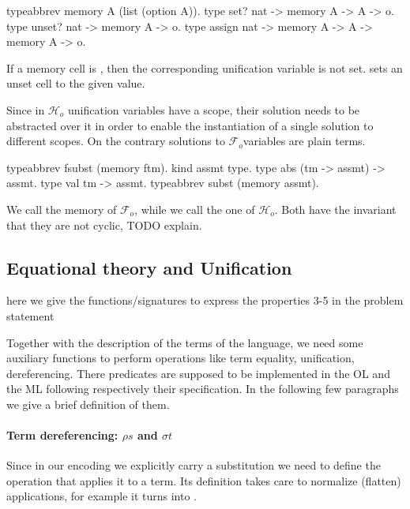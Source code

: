 \documentclass[sigconf,natbib=false]{acmart}
\newcommand{\Fo}{\ensuremath{\mathcal{F}_{\!o}\xspace}} %
\newcommand{\Ho}{\ensuremath{\mathcal{H}_o}\xspace}
\begin{document}
\begin{elpicode}
typeabbrev memory A (list (option A)).
type set?   nat -> memory A -> A -> o.
type unset? nat -> memory A -> o.
type assign nat -> memory A -> A -> memory A -> o.
\end{elpicode}

\noindent 
If a memory cell is , then the corresponding unification variable
is not set.  sets an unset cell to the given value.

Since in \Ho unification variables have a scope, their solution needs to be
abstracted over it in order to enable the instantiation of a single
solution to different scopes. On the contrary solutions to \Fo variables
are plain terms.

\begin{elpicode}
  typeabbrev fsubst (memory ftm).
  kind assmt type.
  type abs (tm -> assmt) -> assmt.
  type val tm -> assmt.
  typeabbrev subst (memory assmt).
\end{elpicode}

\noindent
We call  the memory of \Fo{}, while we call 
the one of \Ho.
Both have the invariant that they are not cyclic, TODO explain.

\subsection{Equational theory and Unification}

here we give the functions/signatures to express the properties 3-5 in the problem
statement

Together with the description of the terms of the language, we need some
auxiliary functions to perform operations like term equality, unification,
dereferencing. There predicates are supposed to be implemented in the OL and the
ML following respectively their specification. In the following few paragraphs
we give a brief definition of them.

\paragraph{Term dereferencing: $\rho s$ and $\sigma t$}

Since in our encoding we explicitly carry a substitution we need to
define the operation that applies it to a term. Its definition
takes care to normalize (flatten) applications, for example
it turns
into
.
\end{document}

